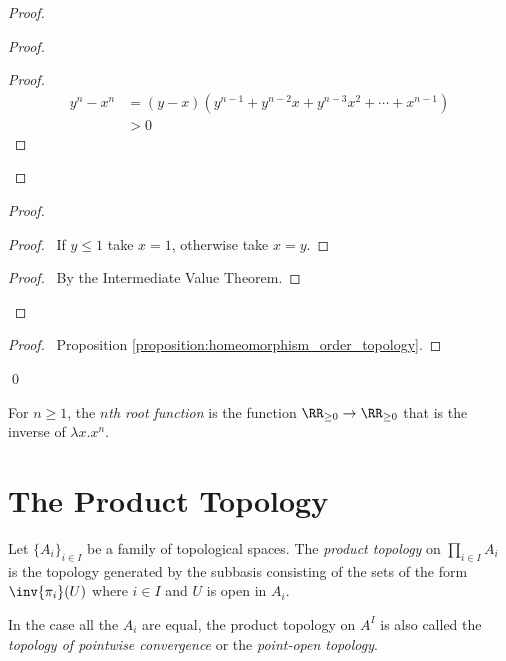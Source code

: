 \begin{proof}
    \pf
    \begin{proof}
        \begin{proof}
            \begin{align*}
                y^n - x^n & = (y - x)(y^{n-1} + y^{n-2}x + y^{n-3}x^2 + \cdots + x^{n-1}) \\
                & > 0
            \end{align*}
        \end{proof}
    \end{proof}
    \begin{proof}
        \begin{proof}
            \pf\ If $y \leq 1$ take $x = 1$, otherwise take $x = y$.
        \end{proof}
        \begin{proof}
            \pf\ By the Intermediate Value Theorem.
        \end{proof}
    \end{proof}
    \qedstep
    \begin{proof}
        \pf\ Proposition \ref{proposition:homeomorphism_order_topology}.
    \end{proof}
    \qed
\end{proof}

\begin{definition}
    For $n \geq 1$, the \emph{$n$th root function} is the function $\RR_{\geq 0} \rightarrow \RR_{\geq 0}$ that is the inverse of $\lambda x.x^n$.
\end{definition}

\section{The Product Topology}

\begin{definition}
    Let $\{ A_i \}_{i \in I}$ be a family of topological spaces. The \emph{product topology} on $\prod_{i \in I} A_i$
    is the topology generated by the subbasis consisting of the sets of the form $\inv{\pi_i}(U)$ where $i \in I$
    and $U$ is open in $A_i$.

    In the case all the $A_i$ are equal, the product topology on $A^I$ is also called the \emph{topology of pointwise convergence}
    or the \emph{point-open topology}.
\end{definition}

